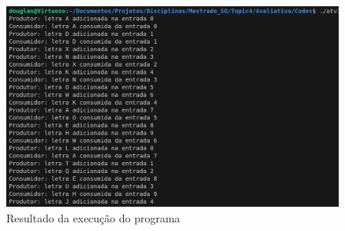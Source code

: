 \documentclass{article}
\begin{document}
\begin{figure}[ht]
    \centering
    \includegraphics[width=1\textwidth]{./Images/image.png}
    \caption{Resultado da execução do programa}
    \label{fig:exec}
\end{figure}

\printbibliography %
\end{document}
